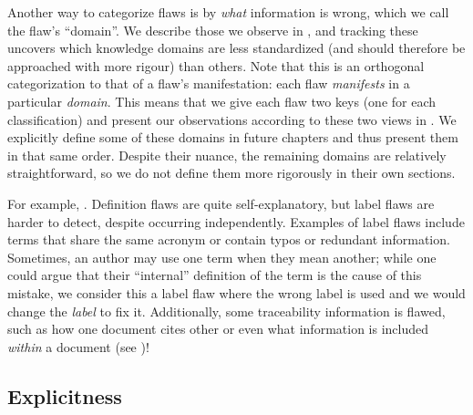 Another way to categorize flaws is by \emph{what} information is wrong, which
we call the flaw's ``domain''. We describe those we observe in
, and tracking these uncovers which knowledge domains
are less standardized (and should therefore be approached with more rigour)
than others. Note that this is an orthogonal categorization to that of a flaw's
manifestation: each flaw \emph{manifests} in a particular \emph{domain}. This
means that we give each flaw two keys (one for each classification) and
present our observations according to these two views in . We explicitly define some of these domains in future
chapters and thus present them in that same order. Despite their nuance, the
remaining domains are relatively straightforward, so we do not define them more
rigorously in their own sections.



\label{label-flaw-def}
For example, . Definition flaws are quite self-explanatory, but
label flaws are harder to detect, despite occurring independently. Examples of
label flaws include terms that share the same acronym or contain typos or
redundant information. Sometimes, an author may use one term when they mean
another; while one could argue that their ``internal'' definition of the term
is the cause of this mistake, we consider this a label flaw where the wrong
label is used and we would change the \emph{label} to fix it.
\label{trace-flaw-def}%
Additionally, some traceability information is flawed, such as how one document
cites other or even what information is included \emph{within} a document
(see )!

\subsection{Explicitness}\label{explicitness}

\def\impKeywordsCode{\seeSrcCode{23dbe41}{scripts/helpers.py}{25}{54}}

